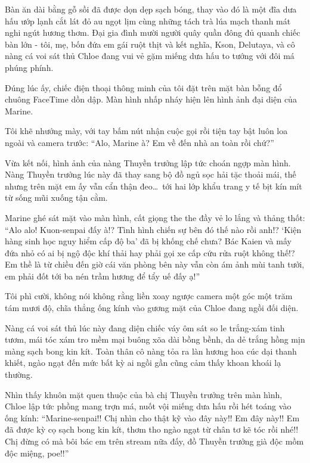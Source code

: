 \documentclass[../main.tex]{subfiles}
\begin{document}
Bàn ăn dài bằng gỗ sồi đã được dọn dẹp sạch bóng, thay vào đó là một đĩa dưa hấu ướp lạnh cắt lát đỏ au ngọt lịm cùng những tách trà lúa mạch thanh mát nghi ngút hương thơm. Đại gia đình mười người quây quần đông đủ quanh chiếc bàn lớn - tôi, mẹ, bốn đứa em gái ruột thịt và kết nghĩa, Kson, Delutaya, và cô nàng cá voi sát thủ Chloe đang vui vẻ gặm miếng dưa hấu to tướng với đôi má phúng phính.

Đúng lúc ấy, chiếc điện thoại thông minh của tôi đặt trên mặt bàn bỗng đổ chuông FaceTime dồn dập. Màn hình nhấp nháy hiện lên hình ảnh đại diện của Marine.

Tôi khẽ nhướng mày, với tay bấm nút nhận cuộc gọi rồi tiện tay bật luôn loa ngoài và camera trước: ``Alo, Marine à? Em về đến nhà an toàn rồi chứ?''

Vừa kết nối, hình ảnh của nàng Thuyền trưởng lập tức choán ngợp màn hình. Nàng Thuyền trưởng lúc này đã thay sang bộ đồ ngủ sọc hải tặc thoải mái, thế nhưng trên mặt em ấy vẫn cẩn thận đeo\dots\ tới hai lớp khẩu trang y tế bịt kín mít từ sống mũi xuống tận cằm.

Marine ghé sát mặt vào màn hình, cất giọng the the đầy vẻ lo lắng và thảng thốt: ``Alo alo! Kuon-senpai đấy à!? Tình hình chiến sự bên đó thế nào rồi anh!? `Kiện hàng sinh học nguy hiểm cấp độ ba' đã bị khống chế chưa? Bác Kaien và mấy đứa nhỏ có ai bị ngộ độc khí thải hay phải gọi xe cấp cứu rửa ruột không thế!? Em thề là từ chiều đến giờ cái văn phòng bên này vẫn còn ám ảnh mùi tanh tưởi, em phải đốt tới ba nén trầm hương để tẩy uế đấy ạ!''

Tôi phì cười, không nói không rằng liền xoay ngược camera một góc một trăm tám mươi độ, chĩa thẳng ống kính vào gương mặt của Chloe đang ngồi đối diện.

Nàng cá voi sát thủ lúc này đang diện chiếc váy ôm sát so le trắng-xám tinh tươm, mái tóc xám tro mềm mại buông xõa dài bồng bềnh, da dẻ trắng hồng mịn màng sạch bong kin kít. Toàn thân cô nàng tỏa ra làn hương hoa cúc dại thanh khiết, ngào ngạt đến mức bất kỳ ai ngồi gần cũng cảm thấy khoan khoái lạ thường.

Nhìn thấy khuôn mặt quen thuộc của bà chị Thuyền trưởng trên màn hình, Chloe lập tức phồng mang trợn má, nuốt vội miếng dưa hấu rồi hét toáng vào ống kính: ``Marine-senpai!! Chị nhìn cho thật kỹ vào đây này!! Em đây này!! Em đã được kỳ cọ sạch bong kin kít, thơm tho ngào ngạt từ chân tơ kẽ tóc rồi nhé!! Chị đừng có mà bôi bác em trên stream nữa đấy, đồ Thuyền trưởng già độc mồm độc miệng, poe!!''
\end{document}
